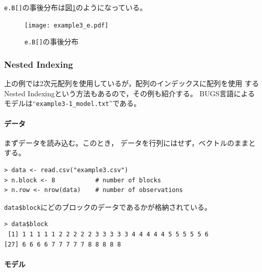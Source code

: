 \documentclass[11pt,uplatex]{jsarticle}
\begin{document}
\texttt{e.B[]}の事後分布は図\ref{example3_e_plot}のようになっている。


\begin{figure}[htbp]
	\begin{center}
		\texttt{[image: example3\_e.pdf]}
	\end{center}
	\caption{\texttt{e.B[]}の事後分布}
	\label{example3_e_plot}
\end{figure}


\subsubsection*{Nested Indexing}
上の例では2次元配列を使用しているが，配列のインデックスに配列を使用
するNested Indexingという方法もあるので，その例も紹介する。
BUGS言語によるモデルは``\texttt{example3-1\_model.txt}''である。

\paragraph{データ}

まずデータを読み込む。このとき，
データを行列にはせず，ベクトルのままとする。
\begin{lstlisting}
> data <- read.csv("example3.csv")
> n.block <- 8           # number of blocks
> n.row <- nrow(data)    # number of observations
\end{lstlisting}

\texttt{data\$block}にどのブロックのデータであるかが格納されている。
\begin{lstlisting}
> data$block
 [1] 1 1 1 1 1 2 2 2 2 2 3 3 3 3 3 4 4 4 4 4 5 5 5 5 5 6
[27] 6 6 6 6 7 7 7 7 7 8 8 8 8 8
\end{lstlisting}

\paragraph{モデル}
\end{document}
